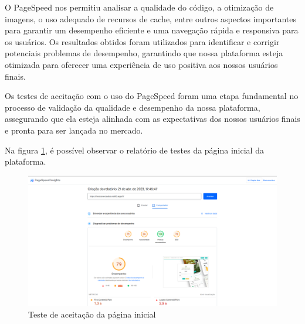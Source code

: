\documentclass[tcc,capa]{texufpel}
\begin{document}

O PageSpeed nos permitiu analisar a qualidade do código, a otimização de imagens, o uso adequado de recursos de cache, entre outros aspectos importantes para garantir um desempenho eficiente e uma navegação rápida e responsiva para os usuários. Os resultados obtidos foram utilizados para identificar e corrigir potenciais problemas de desempenho, garantindo que nossa plataforma esteja otimizada para oferecer uma experiência de uso positiva aos nossos usuários finais.


Os testes de aceitação com o uso do PageSpeed foram uma etapa fundamental no processo de validação da qualidade e desempenho da nossa plataforma, assegurando que ela esteja alinhada com as expectativas dos nossos usuários finais e pronta para ser lançada no mercado.

Na figura \ref{teste-home}, é possível observar o relatório de testes da página inicial da plataforma. 
\begin{figure}[htbp]
  \centering \includegraphics[scale=.25]{assets/desempenho-home.png}
  \caption{Teste de aceitação da página inicial}
  \label{teste-home}
\end{figure}
\end{document}
